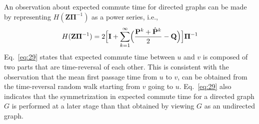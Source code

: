 \documentclass[10pt,twocolumn]{article}
\numberwithin{equation}{section}
\begin{document}
An observation about expected commute time for directed graphs can
be made by representing $H(\mathbf{Z}\bm{\Pi}^{-1}
)$ as a power series, i.e., 
\begin{equation}
  \label{eq:29}
  H(\mathbf{Z}\bm{\Pi}^{-1}) = 
  2 \Bigl[ \mathbf{I} +
  \sum_{k=1}^{\infty}\Bigl(\frac{\mathbf{P}^{k} + \hat{\mathbf{P}}^{k}}{2}
  - \mathbf{Q}\Bigr)\Bigr] \bm{\Pi}^{-1}
\end{equation}
Eq.~\eqref{eq:29} states that expected commute time between $u$ and
$v$ is composed of two parts that are time-reversal of each
other. This is consistent with the observation that the mean first
passage time from $u$ to $v$, can be obtained from the time-reversal
random walk starting from $v$ going to $u$. Eq.~\eqref{eq:29} also
indicates that the symmetrization in expected commute time for a
directed graph $G$ is performed at a later stage than that obtained by
viewing $G$ as an undirected graph. 
\end{document}
